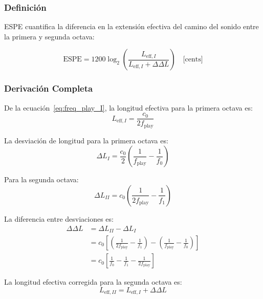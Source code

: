 \documentclass[12pt,a4paper,twocolumn]{article}
\newcommand{\freqzero}{f_0}
\newcommand{\freqone}{f_1}
\newcommand{\freqplay}{f_{\text{play}}}
\begin{document}
\subsubsection{Definición}

ESPE cuantifica la diferencia en la extensión efectiva del camino del sonido entre la primera y segunda octava:

\begin{equation}
\text{ESPE} = 1200 \log_2\left(\frac{L_{\text{eff},I}}{L_{\text{eff},I} + \Delta\Delta L}\right) \quad \text{[cents]}
\label{eq:espe_def}
\end{equation}

\subsubsection{Derivación Completa}

De la ecuación~\eqref{eq:freq_play_I}, la longitud efectiva para la primera octava es:
\begin{equation}
L_{\text{eff},I} = \frac{c_0}{2 \freqplay}
\label{eq:longitud_efectiva_I}
\end{equation}

La desviación de longitud para la primera octava es:
\begin{equation}
\Delta L_I = \frac{c_0}{2}\left(\frac{1}{\freqplay} - \frac{1}{\freqzero}\right)
\label{eq:delta_L_I}
\end{equation}

Para la segunda octava:
\begin{equation}
\Delta L_{II} = c_0\left(\frac{1}{2\freqplay} - \frac{1}{\freqone}\right)
\label{eq:delta_L_II}
\end{equation}

La diferencia entre desviaciones es:
\begin{align}
\Delta\Delta L &= \Delta L_{II} - \Delta L_I \\
&= c_0\left[\left(\frac{1}{2\freqplay} - \frac{1}{\freqone}\right) - \left(\frac{1}{\freqplay} - \frac{1}{\freqzero}\right)\right] \\
&= c_0\left[\frac{1}{\freqzero} - \frac{1}{\freqone} - \frac{1}{2\freqplay}\right]
\label{eq:delta_delta_L_espe}
\end{align}

La longitud efectiva corregida para la segunda octava es:
\begin{equation}
L_{\text{eff},II} = L_{\text{eff},I} + \Delta\Delta L
\label{eq:longitud_efectiva_II}
\end{equation}
\end{document}
